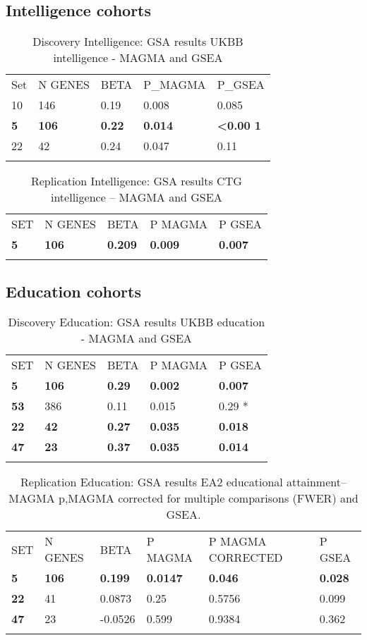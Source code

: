 \subsection{Intelligence cohorts}
\begin{longtable}[h]{@{}lllll@{}}
\toprule
Set & N GENES & BETA & P\_MAGMA & P\_GSEA\tabularnewline
10 & 146 & 0.19 & 0.008 & 0.085\tabularnewline
\textbf{5} & \textbf{106} & \textbf{0.22} & \textbf{0.014} & \textbf{\textless{}0.00
1}\tabularnewline
22 & 42 & 0.24 & 0.047 & 0.11\tabularnewline
\bottomrule
\caption{Discovery Intelligence: GSA results UKBB intelligence - MAGMA and GSEA}
\label{Table:Discovery Intelligence: GSA results UKBB intelligence - MAGMA and GSEA}
\end{longtable}



\begin{longtable}[]{@{}lllll@{}}
\toprule
SET & N GENES & BETA & P MAGMA & P GSEA\tabularnewline
\textbf{5} & \textbf{106} & \textbf{0.209} & \textbf{0.009} & \textbf{0.007}\tabularnewline
\bottomrule
\caption{Replication Intelligence: GSA results CTG intelligence -- MAGMA and GSEA}
\label{Replication Intelligence: GSA results CTG intelligence -- MAGMA and GSEA}
\end{longtable}




\subsection{Education cohorts}

\begin{longtable}[]{@{}lllll@{}}
\toprule
SET & N GENES & BETA & P MAGMA & P GSEA\tabularnewline
\textbf{5} & \textbf{106} & \textbf{0.29} & \textbf{0.002} & \textbf{0.007}\tabularnewline
\textbf{53} & 386 & 0.11 & 0.015 & 0.29 *\tabularnewline
\textbf{22} & \textbf{42} & \textbf{0.27} & \textbf{0.035} & \textbf{0.018}\tabularnewline
\textbf{47} & \textbf{23} & \textbf{0.37} & \textbf{0.035} & \textbf{0.014}\tabularnewline
\bottomrule
\caption{Discovery Education: GSA results UKBB education - MAGMA and GSEA}
\label{Table:Discovery Education: GSA results UKBB education - MAGMA and GSEA}
\end{longtable}



\begin{longtable}[]{@{}llllll@{}}
\toprule
SET & N GENES & BETA & P MAGMA & P MAGMA CORRECTED & P GSEA\tabularnewline
\textbf{5} & \textbf{106} & \textbf{0.199} & \textbf{0.0147} & \textbf{0.046} & \textbf{0.028}\tabularnewline
\textbf{22} & 41 & 0.0873 & 0.25 & 0.5756 & 0.099\tabularnewline
\textbf{47} & 23 & -0.0526 & 0.599 & 0.9384 & 0.362\tabularnewline
\bottomrule
\caption{Replication Education: GSA results EA2 educational attainment-- MAGMA p,MAGMA corrected for multiple comparisons (FWER) and GSEA.}
\label{Table:Replication Education: GSA results EA2 educational attainment-- MAGMA p,MAGMA corrected for multiple comparisons (FWER) and GSEA.}
\end{longtable}

